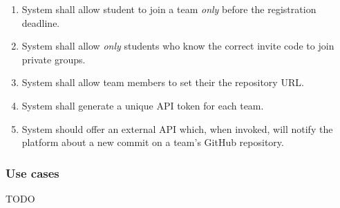 \begin{enumerate}[label=$\bullet$ \textbf{R\arabic*:}]
    \item System shall allow student to join a team \textit{only} before the registration deadline.
    \item System shall allow \textit{only} students who know the correct invite code to join private groups.
    \item System shall allow team members to set their the repository URL.
    \item System shall generate a unique API token for each team.
    \item System should offer an external API which, when invoked, will notify the platform about a new commit on a team’s GitHub repository.
\end{enumerate}
\subsubsection{Use cases}
TODO
